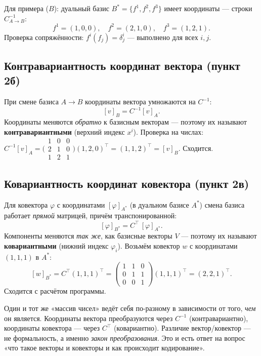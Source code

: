 \documentclass[11pt]{article}
\begin{document}
Для примера ($B$): дуальный базис $B^{*}=\{f^1,f^2,f^3\}$ имеет координаты — строки
$C_{A\to B}^{-1}$:
\[
f^1=(1,0,0),\quad f^2=(2,1,0),\quad f^3=(1,2,1).
\]
Проверка сопряжённости: $f^{i}(f_j)=\delta^{i}_j$ — выполнено для всех $i,j$.

\subsection{Контравариантность координат вектора (пункт 2б)}
\label{ssec:contra}

При смене базиса $A\to B$ координаты вектора умножаются на $C^{-1}$:
\[
  [v]_B=C^{-1}[v]_A.
\]
Координаты меняются \emph{обратно} к базисным векторам — поэтому их называют
\textbf{контравариантными} (верхний индекс $x^{i}$). Проверка на числах:
$C^{-1}[v]_A=\big(\begin{smallmatrix}1&0&0\\2&1&0\\1&2&1\end{smallmatrix}\big)(1,2,0)^{\!\top}
=(1,1,2)^{\top}=[v]_B$. Сходится.

\subsection{Ковариантность координат ковектора (пункт 2в)}
\label{ssec:cova}

Для ковектора $\varphi$ с координатами $[\varphi]_{A^{*}}$ (в дуальном базисе $A^{*}$)
смена базиса работает \emph{прямой} матрицей, причём транспонированной:
\[
  [\varphi]_{B^{*}}=C^{\top}\,[\varphi]_{A^{*}}.
\]
Компоненты меняются \emph{так же}, как базисные векторы $V$ — поэтому их называют
\textbf{ковариантными} (нижний индекс $\varphi_i$). Возьмём ковектор $w$ с координатами
$(1,1,1)$ в $A^{*}$:
\[
[w]_{B^{*}}=C^{\top}(1,1,1)^{\top}=
\begin{pmatrix}1&1&0\\0&1&1\\0&0&1\end{pmatrix}(1,1,1)^{\top}=(2,2,1)^{\top}.
\]
Сходится с расчётом программы.

\begin{okbox}
Один и тот же «массив чисел» ведёт себя по-разному в зависимости от того, \emph{чем} он
является. Координаты вектора преобразуются через $C^{-1}$ (контравариантно), координаты
ковектора — через $C^{\top}$ (ковариантно). Различие вектор/ковектор — не формальность,
а именно \emph{закон преобразования}. Это и есть ответ на вопрос «что такое векторы и
ковекторы и как происходит кодирование».
\end{okbox}
\end{document}

